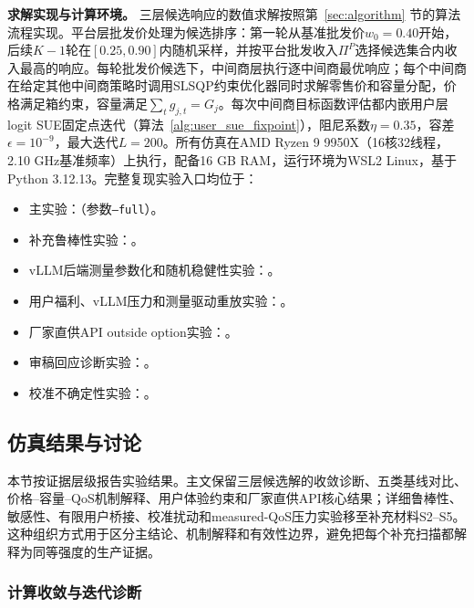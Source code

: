 \documentclass[UTF8,11pt]{ctexart}
\begin{document}
\textbf{求解实现与计算环境。} 三层候选响应的数值求解按照第~\ref{sec:algorithm} 节的算法流程实现。平台层批发价处理为候选排序：第一轮从基准批发价$w_0=0.40$开始，后续$K-1$轮在$[0.25,0.90]$内随机采样，并按平台批发收入$\Pi^P$选择候选集合内收入最高的响应。每轮批发价候选下，中间商层执行逐中间商最优响应；每个中间商在给定其他中间商策略时调用SLSQP约束优化器同时求解零售价和容量分配，价格满足箱约束，容量满足$\sum_t g_{j,t}=G_j$。每次中间商目标函数评估都内嵌用户层logit SUE固定点迭代（算法~\ref{alg:user_sue_fixpoint}），阻尼系数$\eta=0.35$，容差$\epsilon=10^{-9}$，最大迭代$L=200$。所有仿真在AMD Ryzen 9 9950X（16核32线程，2.10 GHz基准频率）上执行，配备16 GB RAM，运行环境为WSL2 Linux，基于Python 3.12.13。完整复现实验入口均位于：
\begin{itemize}[leftmargin=2em]
  \item 主实验：（参数\texttt{--full}）。
  \item 补充鲁棒性实验：。
  \item vLLM后端测量参数化和随机稳健性实验：。
  \item 用户福利、vLLM压力和测量驱动重放实验：。
  \item 厂家直供API outside option实验：。
  \item 审稿回应诊断实验：。
  \item 校准不确定性实验：。
\end{itemize}

\subsection{仿真结果与讨论}
\label{sec:simulation_results}

本节按证据层级报告实验结果。主文保留三层候选解的收敛诊断、五类基线对比、价格--容量--QoS机制解释、用户体验约束和厂家直供API核心结果；详细鲁棒性、敏感性、有限用户桥接、校准扰动和measured-QoS压力实验移至补充材料S2--S5。这种组织方式用于区分主结论、机制解释和有效性边界，避免把每个补充扫描都解释为同等强度的生产证据。

\subsubsection{计算收敛与迭代诊断}
\label{sec:calculation_convergence}
\end{document}
